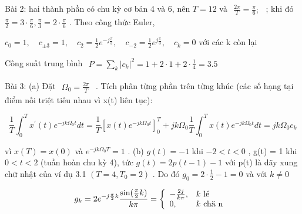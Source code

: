 \documentclass[
  10
]{article}
\begin{document}
Bài 2: hai thành phần có chu kỳ cơ bản 4 và 6, nên \(T = 1 2\) và
\(\begin{array} { r } { \frac { 2 \pi } { T } = \frac { \pi } { 6 } ; } \end{array}\)
; khi đó
\(\textstyle { \frac { \pi } { 2 } } = 3 \cdot { \frac { \pi } { 6 } } , { \frac { \pi } { 3 } } = 2 \cdot { \frac { \pi } { 6 } }\)
. Theo công thức Euler,

\(c _ { 0 } = 1 , \quad c _ { \pm 3 } = 1 , \quad c _ { 2 } = \frac 1 2 e ^ { - j \frac \pi 3 } , \quad c _ { - 2 } = \frac 1 2 e ^ { j \frac \pi 3 } , \quad c _ { k } = 0\)
với các k còn lại

Công suất trung bình
\(\begin{array} { r } { P = \sum _ { k } | c _ { k } | ^ { 2 } = 1 + 2 \cdot 1 + 2 \cdot \frac { 1 } { 4 } = 3 . 5 } \end{array}\)

Bài 3: (a) Đặt
\(\begin{array} { r } { \Omega _ { 0 } = \frac { 2 \pi } { T } } \end{array}\)
. Tích phân từng phần trên từng khúc (các số hạng tại điểm nối triệt
tiêu nhau vì x(t) liên tục):

\[
\frac {1}{T} \int_ {0} ^ {T} x ^ {\prime} (t) e ^ {- j k \Omega_ {0} t} d t = \frac {1}{T} \left[ x (t) e ^ {- j k \Omega_ {0} t} \right] _ {0} ^ {T} + j k \Omega_ {0} \frac {1}{T} \int_ {0} ^ {T} x (t) e ^ {- j k \Omega_ {0} t} d t = j k \Omega_ {0} c _ {k}
\]

vì \(x ( T ) = x ( 0 )\) và \(e ^ { - j k \Omega _ { 0 } T } = 1\) . (b)
\(g ( t ) = - 1\) khi \(- 2 < t < 0\) , g(t) = 1 khi \(0 < t < 2\) (tuần
hoàn chu kỳ 4), tức \(g ( t ) = 2 p ( t - 1 ) - 1\) với p(t) là dãy xung
chữ nhật của ví dụ 3.1 \(( T = 4 , T _ { 0 } = 2 )\) . Do đó
\(g _ { 0 } = 2 \cdot { \textstyle \frac { 1 } { 2 } } - 1 = 0\) và với
\(k \neq 0\)

\[
g _ {k} = 2 e ^ {- j \frac {\pi}{2} k} \frac {\sin (\frac {\pi}{2} k)}{k \pi} = \left\{ \begin{array}{l l} - \frac {2 j}{k \pi}, & k \text {   l\'e } \\ 0, & k \text {   ch\"{a} n } \end{array} \right.
\]
\end{document}

